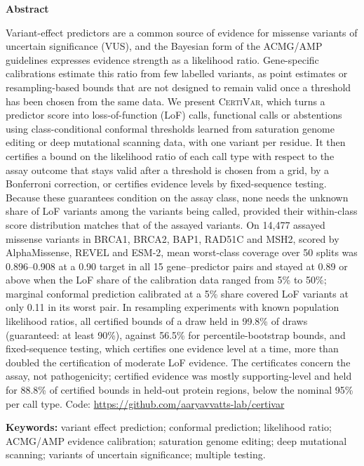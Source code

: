 \begin{center}\textbf{Abstract}\end{center}
\noindent Variant-effect predictors are a common source of evidence for missense variants of uncertain significance (VUS),
and the Bayesian form of the ACMG/AMP guidelines expresses evidence strength as a likelihood ratio. Gene-specific
calibrations estimate this ratio from few labelled variants, as point estimates or resampling-based bounds that are not designed to remain valid once a threshold has been chosen
from the same data. We present \textsc{CertiVar}, which
turns a predictor score into loss-of-function (LoF) calls, functional calls or abstentions using class-conditional
conformal thresholds learned from saturation genome editing or deep mutational scanning data, with one variant per residue. It then certifies a bound on the
likelihood ratio of each call type with respect to the assay outcome that stays valid after a threshold is chosen from a
grid, by a Bonferroni correction, or certifies evidence levels by fixed-sequence testing. Because these
guarantees condition on the assay class, none needs the unknown share of LoF variants among the variants being called, provided their
within-class score distribution matches that of the assayed variants.
On 14,477 assayed missense variants in BRCA1, BRCA2, BAP1, RAD51C and MSH2, scored by AlphaMissense, REVEL and ESM-2,
mean worst-class coverage over 50 splits was 0.896--0.908 at a 0.90 target in all 15 gene--predictor pairs and stayed at 0.89 or above when
the LoF share of the calibration data ranged from 5\% to 50\%; marginal conformal prediction calibrated at a 5\% share
covered LoF variants at only 0.11 in its worst pair. In resampling experiments with known population likelihood ratios,
all certified bounds of a draw held in 99.8\% of draws (guaranteed: at least 90\%), against 56.5\% for
percentile-bootstrap bounds, and fixed-sequence testing, which certifies one evidence level at a time, more than doubled
the certification of moderate LoF evidence. The certificates concern the assay, not pathogenicity; certified evidence was mostly
supporting-level and held for 88.8\% of certified bounds in held-out protein regions, below the nominal 95\% per call type. Code:
\url{https://github.com/aaryavvatts-lab/certivar}

\medskip\noindent\textbf{Keywords:} variant effect prediction; conformal prediction; likelihood ratio; ACMG/AMP
evidence calibration; saturation genome editing; deep mutational scanning; variants of uncertain significance;
multiple testing.

